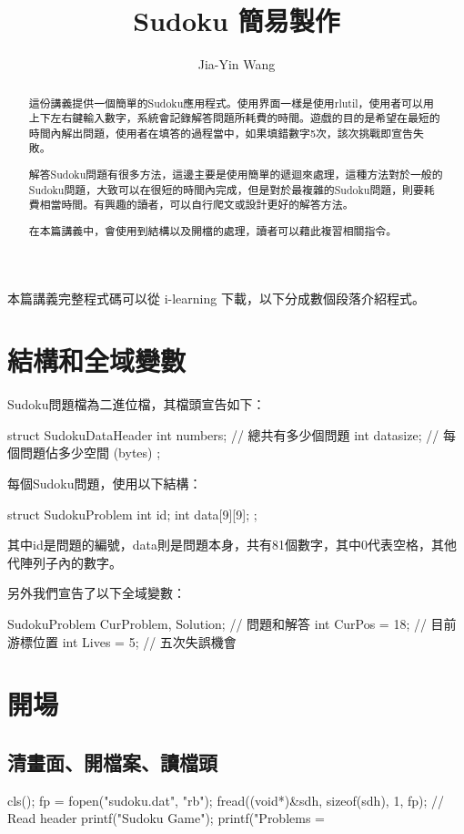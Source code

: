 \documentclass[12pt,a4paper]{article}
\begin{document}
\title{Sudoku 簡易製作}
\author{Jia-Yin Wang}
\maketitle

\begin{abstract}
這份講義提供一個簡單的Sudoku應用程式。使用界面一樣是使用rlutil，使用者可以用上下左右鍵輸入數字，系統會記錄解答問題所耗費的時間。遊戲的目的是希望在最短的時間內解出問題，使用者在填答的過程當中，如果填錯數字5次，該次挑戰即宣告失敗。

解答Sudoku問題有很多方法，這邊主要是使用簡單的遞迴來處理，這種方法對於一般的Sudoku問題，大致可以在很短的時間內完成，但是對於最複雜的Sudoku問題，則要耗費相當時間。有興趣的讀者，可以自行爬文或設計更好的解答方法。

在本篇講義中，會使用到結構以及開檔的處理，讀者可以藉此複習相關指令。
\end{abstract}

本篇講義完整程式碼可以從 i-learning 下載，以下分成數個段落介紹程式。
\section{結構和全域變數}
Sudoku問題檔為二進位檔，其檔頭宣告如下：
\begin{inside}
struct SudokuDataHeader {
	int numbers; // 總共有多少個問題
	int datasize; // 每個問題佔多少空間 (bytes)
};
\end{inside}

每個Sudoku問題，使用以下結構：
\begin{inside}
struct SudokuProblem {
	int id;
	int data[9][9];
};
\end{inside}

\indent
其中id是問題的編號，data則是問題本身，共有81個數字，其中0代表空格，其他代陣列子內的數字。

另外我們宣告了以下全域變數：
\begin{inside}
SudokuProblem CurProblem, Solution; // 問題和解答
int CurPos = 18; // 目前游標位置
int Lives = 5;   // 五次失誤機會
\end{inside}

\vspace{0.5cm}
\section{開場}
\subsection{清畫面、開檔案、讀檔頭}
\begin{inside}
cls();
fp = fopen("sudoku.dat", "rb");
fread((void*)&sdh, sizeof(sdh),  1, fp); // Read header
printf("\n\nMy Sudoku Game\n\n");
printf("\nTotal Problems = %
\end{inside}
\end{document}
